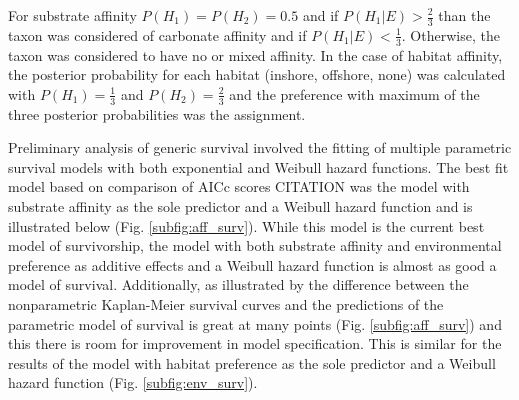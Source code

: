 \documentclass[12pt,letterpaper]{article}
\begin{document}
For substrate affinity \(P(H_{1}) = P(H_{2}) = 0.5\) and if \(P(H_{1}|E) > \frac{2}{3}\) than the taxon was considered of carbonate affinity and if \(P(H_{1}|E) < \frac{1}{3}\). Otherwise, the taxon was considered to have no or mixed affinity. In the case of habitat affinity, the posterior probability for each habitat (inshore, offshore, none) was calculated with \(P(H_{1}) = \frac{1}{3}\) and \(P(H_{2}) = \frac{2}{3}\) and the preference with maximum of the three posterior probabilities was the assignment.

Preliminary analysis of generic survival involved the fitting of multiple parametric survival models with both exponential and Weibull hazard functions. The best fit model based on comparison of AICc scores CITATION was the model with substrate affinity as the sole predictor and a Weibull hazard function and is illustrated below (Fig. \ref{subfig:aff_surv}). While this model is the current best model of survivorship, the model with both substrate affinity and environmental preference as additive effects and a Weibull hazard function is almost as good a model of survival. Additionally, as illustrated by the difference between the nonparametric Kaplan-Meier survival curves and the predictions of the parametric model of survival is great at many points (Fig. \ref{subfig:aff_surv}) and this there is room for improvement in model specification. This is similar for the results of the model with habitat preference as the sole predictor and a Weibull hazard function (Fig. \ref{subfig:env_surv}).
\end{document}
